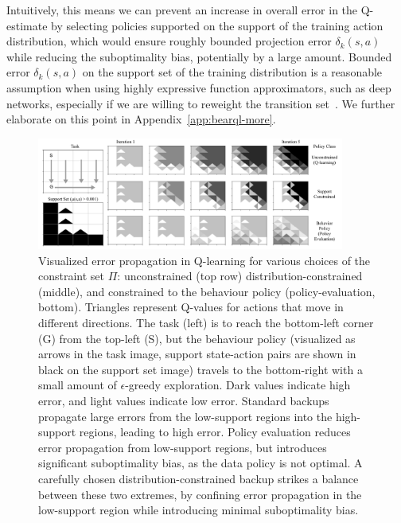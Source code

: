 Intuitively, this means we can prevent an increase in overall error in the Q-estimate by selecting policies supported on the support of the training action distribution, which would ensure roughly bounded projection error $\delta_k(s, a)$ while reducing the suboptimality bias, potentially by a large amount. Bounded error $\delta_k(s, a)$ on the support set of the training distribution is a reasonable assumption when using highly expressive function approximators, such as deep networks, especially if we are willing to reweight the transition set~\cite{Schaul2016PrioritizedER,fu2019diagnosing}. We further elaborate on this point in Appendix~\ref{app:bearql-more}.

\begin{figure}
    \centering
    \vspace{-0.1in}
    \includegraphics[width=0.9\textwidth]{chapters/bear/images/gridworld}
    \caption{ \footnotesize Visualized error propagation in Q-learning for various choices of the constraint set $\Pi$:
    unconstrained (top row)
    distribution-constrained (middle),
    and constrained to the behaviour policy (policy-evaluation, bottom). Triangles represent Q-values for actions that move in different directions. The task (left) is to reach the bottom-left corner (G) from the top-left (S), but the behaviour policy (visualized as arrows in the task image, support state-action pairs are shown in black on the support set image) travels to the bottom-right with a small amount of $\epsilon$-greedy exploration. Dark values indicate high error, and light values indicate low error. Standard backups propagate large errors from the low-support regions into the high-support regions, leading to high error. Policy evaluation reduces error propagation from low-support regions, but introduces significant suboptimality bias, as the data policy is not optimal. A carefully chosen distribution-constrained backup strikes a balance between these two extremes, by confining error propagation in the low-support region while introducing minimal suboptimality bias.}
    \label{fig:gridworld}
    \vspace{-0.1in}
\end{figure}

